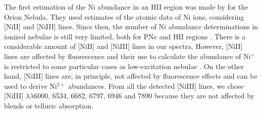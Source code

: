 \documentclass[fleqn,usenatbib]{mnras}
\begin{document}
The first estimation of the Ni abundance in an H\thinspace II region was made by \citet{osterbrock92} for the Orion Nebula. They used estimates of the atomic data of Ni ions, considering [Ni\thinspace II] and [Ni\thinspace  III] lines. Since then, the number of Ni abundance determinations in ionized nebulae is still very limited, both for PNe \citep{Zhang06,garciarojas13,delgadoinglada16} and H\thinspace II regions \citep{mesadelgado09,delgadoinglada16}. There is a considerable amount of \mbox{[Ni}\thinspace \mbox{II]} and \mbox{[Ni}\thinspace \mbox{III]} lines in our spectra. However, \mbox{[Ni}\thinspace \mbox{II]} lines are affected by fluorescence \citep{Lucy95} and their use to calculate the abundance of Ni$^{+}$ is restricted to some particular cases as low-excitation nebulae \citep{Zhang06}. On the other hand,  \mbox{[Ni}\thinspace \mbox{III]} lines are, in principle, not affected by fluorescence effects and can be used to derive Ni$^{2+}$ abundances. From all the detected [Ni\thinspace III] lines, we chose [Ni\thinspace III] $\lambda \lambda$6000, 6534, 6682, 6797, 6946 and 7890 because they are not affected by blends or telluric absorption. 
\end{document}
